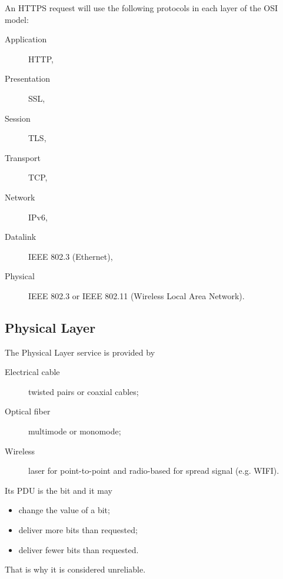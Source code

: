 \begin{myexem}
  An HTTPS request will use the following protocols in each layer of the OSI model:
  \begin{description}
    \item[Application] HTTP,
    \item[Presentation] SSL,
    \item[Session] TLS,
    \item[Transport] TCP,
    \item[Network] IPv6,
    \item[Datalink] IEEE 802.3 (Ethernet),
    \item[Physical] IEEE 802.3 or IEEE 802.11 (Wireless Local Area Network).
  \end{description}
\end{myexem}

\subsection{Physical Layer}
The Physical Layer service is provided by
\begin{description}
  \item[Electrical cable] twisted pairs or coaxial cables;
  \item[Optical fiber] multimode or monomode;
  \item[Wireless] laser for point-to-point and radio-based for spread signal (e.g. WIFI).
\end{description}
Its PDU is the bit and it may
\begin{itemize}
  \item change the value of a bit;
  \item deliver more bits than requested;
  \item deliver fewer bits than requested.
\end{itemize}
That is why it is considered unreliable.

